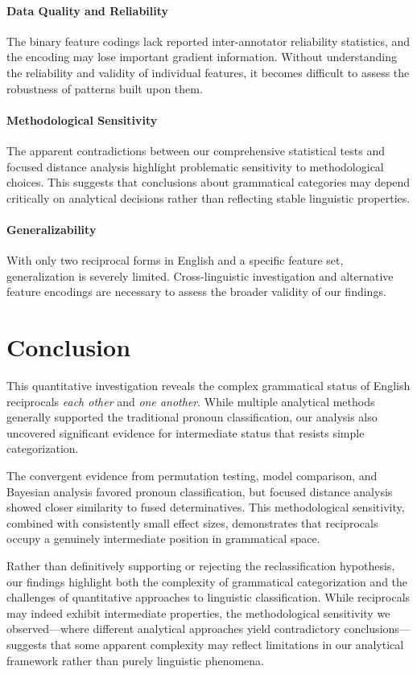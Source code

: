 \documentclass[12pt]{article}
\begin{document}
\paragraph{Data Quality and Reliability}
The binary feature codings lack reported inter-annotator reliability statistics, and the encoding may lose important gradient information. Without understanding the reliability and validity of individual features, it becomes difficult to assess the robustness of patterns built upon them.

\paragraph{Methodological Sensitivity}
The apparent contradictions between our comprehensive statistical tests and focused distance analysis highlight problematic sensitivity to methodological choices. This suggests that conclusions about grammatical categories may depend critically on analytical decisions rather than reflecting stable linguistic properties.

\paragraph{Generalizability}
With only two reciprocal forms in English and a specific feature set, generalization is severely limited. Cross-linguistic investigation and alternative feature encodings are necessary to assess the broader validity of our findings.

\section{Conclusion}

This quantitative investigation reveals the complex grammatical status of English reciprocals \textit{each other} and \textit{one another}. While multiple analytical methods generally supported the traditional pronoun classification, our analysis also uncovered significant evidence for intermediate status that resists simple categorization.

The convergent evidence from permutation testing, model comparison, and Bayesian analysis favored pronoun classification, but focused distance analysis showed closer similarity to fused determinatives. This methodological sensitivity, combined with consistently small effect sizes, demonstrates that reciprocals occupy a genuinely intermediate position in grammatical space.

Rather than definitively supporting or rejecting the reclassification hypothesis, our findings highlight both the complexity of grammatical categorization and the challenges of quantitative approaches to linguistic classification. While reciprocals may indeed exhibit intermediate properties, the methodological sensitivity we observed—where different analytical approaches yield contradictory conclusions—suggests that some apparent complexity may reflect limitations in our analytical framework rather than purely linguistic phenomena.
\end{document}
